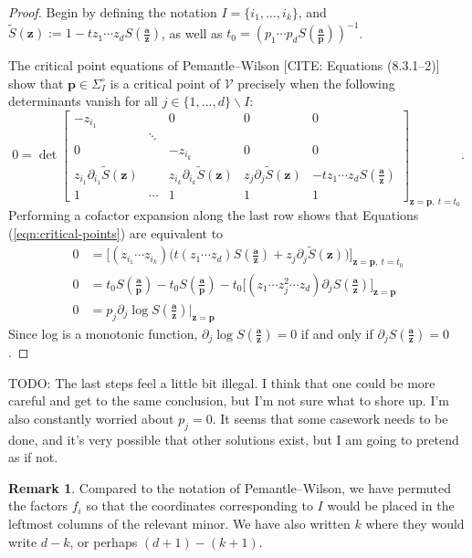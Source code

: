 \documentclass[A4,12pt]{article}
\newcommand{\<}{\left\langle}
\renewcommand{\>}{\right\rangle}
\newcommand{\variety}{\mathcal{V}}
\newcommand{\z}{\mathbf{z}}
\renewcommand{\a}{\mathbf{a}}
\newcommand{\ts}{\textstyle}
\theoremstyle{definition}
\theoremstyle{example}
\newtheorem{remark}[theorem]{Remark}
\begin{document}
\begin{proof}
Begin by defining the notation $I=\{i_1,\dots, i_k\}$, and $\tilde{S}(\z) := 1-tz_1\cdots z_dS(\frac{\a}{\z})$, as well as $t_0=\left(p_1\cdots p_d S({\ts\frac{\a}{\mathbf{p}}})\right)^{-1}$.

The critical point equations of Pemantle--Wilson [CITE: Equations (8.3.1--2)] show that $\mathbf{p}\in \Sigma_I^\circ$ is a critical point of $\variety$ precisely when the following determinants vanish for all $j\in \{1,\dots, d\}\smallsetminus I$:
\begin{equation}
\label{eqn:critical-points}
0 = \det \begin{bmatrix}
-z_{i_1} & ~ & 0 & 0 & 0 \\
 &\ddots & ~ & ~ \\
0 & ~ & -z_{i_k} & 0 & 0 \\
z_{i_1}\partial_{i_1} \tilde{S}(\z) & ~ & z_{i_k}\partial_{i_k} \tilde{S}(\z) & z_j\partial_j \tilde{S}(\z) & -tz_1\cdots z_d S(\frac{\a}{\z}) \\
1 & \cdots & 1 & 1 & 1
\end{bmatrix}_{\z=\mathbf{p},~ t=t_0}.
\end{equation}
 Performing a cofactor expansion along the last row shows that Equations (\ref{eqn:critical-points}) are equivalent to
\begin{align*}
0 &= \Big[ (z_{i_1}\cdots z_{i_k})\big( t(z_{1}\cdots z_d)S({\ts\frac{\a}{\z}})+z_j\partial_j \tilde{S}(\z)\big)\Big]_{\z=\mathbf{p},~ t=t_0} \\
0 &= t_0S({\ts\frac{\a}{\mathbf{p}}})-t_0S({\ts\frac{\a}{\mathbf{p}}})-t_0\Big[(z_1\cdots z_j^2\cdots z_d)\partial_j S({\ts\frac{\a}{\z}})\Big]_{\z=\mathbf{p}} \\
0 &= p_j \partial_j \log S({\ts\frac{\a}{\z}})\Big\vert_{\z=\mathbf{p}}
\end{align*}
Since log is a monotonic function, $\partial_j \log S({\ts\frac{\a}{\z}})=0$ if and only if $\partial_j S({\ts\frac{\a}{\z}})=0$.
\end{proof}

TODO: The last steps feel a little bit illegal. I think that one could be more careful and get to the same conclusion, but I'm not sure what to shore up. I'm also constantly worried about $p_j=0$. It seems that some casework needs to be done, and it's very possible that other solutions exist, but I am going to pretend as if not.

\begin{remark}
Compared to the notation of Pemantle--Wilson, we have permuted the factors $f_i$ so that the coordinates corresponding to $I$ would be placed in the leftmost columns of the relevant minor. We have also written $k$ where they would write $d-k$, or perhaps $(d+1)-(k+1)$.
\end{remark}
\end{document}
